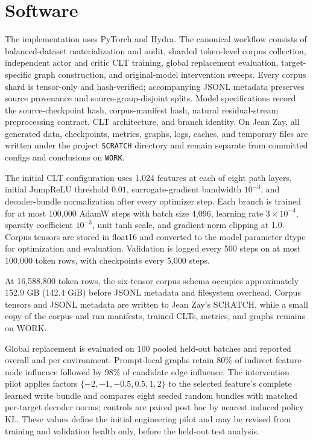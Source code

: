\section{Software}

The implementation uses PyTorch and Hydra. The canonical workflow consists of balanced-dataset materialization and audit, sharded token-level corpus collection, independent actor and critic CLT training, global replacement evaluation, target-specific graph construction, and original-model intervention sweeps. Every corpus shard is tensor-only and hash-verified; accompanying JSONL metadata preserves source provenance and source-group-disjoint splits. Model specifications record the source-checkpoint hash, corpus-manifest hash, natural residual-stream preprocessing contract, CLT architecture, and branch identity. On Jean Zay, all generated data, checkpoints, metrics, graphs, logs, caches, and temporary files are written under the project \texttt{SCRATCH} directory and remain separate from committed configs and conclusions on \texttt{WORK}.

The initial CLT configuration uses 1,024 features at each of eight path layers, initial JumpReLU threshold $0.01$, surrogate-gradient bandwidth $10^{-3}$, and decoder-bundle normalization after every optimizer step. Each branch is trained for at most 100,000 AdamW steps with batch size 4,096, learning rate $3\times10^{-4}$, sparsity coefficient $10^{-3}$, unit tanh scale, and gradient-norm clipping at 1.0. Corpus tensors are stored in float16 and converted to the model parameter dtype for optimization and evaluation. Validation is logged every 500 steps on at most 100,000 token rows, with checkpoints every 5,000 steps.

At 16,588,800 token rows, the six-tensor corpus schema occupies approximately 152.9 GB (142.4 GiB) before JSONL metadata and filesystem overhead. Corpus tensors and JSONL metadata are written to Jean Zay's SCRATCH, while a small copy of the corpus and run manifests, trained CLTs, metrics, and graphs remains on WORK.

Global replacement is evaluated on 100 pooled held-out batches and reported overall and per environment. Prompt-local graphs retain 80\% of indirect feature-node influence followed by 98\% of candidate edge influence. The intervention pilot applies factors $\{-2,-1,-0.5,0.5,1,2\}$ to the selected feature's complete learned write bundle and compares eight seeded random bundles with matched per-target decoder norms; controls are paired post hoc by nearest induced policy KL. These values define the initial engineering pilot and may be revised from training and validation health only, before the held-out test analysis.
